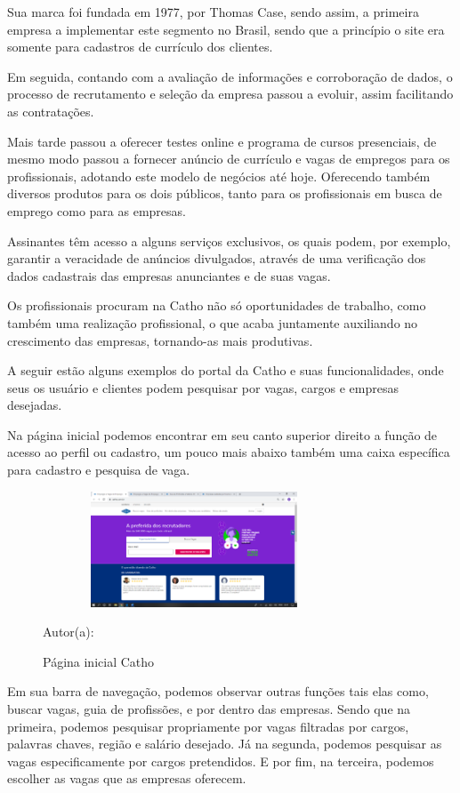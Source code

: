 Sua marca foi fundada em 1977, por Thomas Case, sendo assim, a primeira empresa a implementar este segmento no Brasil, sendo que a princípio o site era somente para cadastros de currículo dos clientes.

Em seguida, contando com a avaliação de informações e corroboração de dados, o processo de recrutamento e seleção da empresa passou a evoluir, assim facilitando as contratações.

Mais tarde passou a oferecer testes online e programa de cursos presenciais, de mesmo modo passou a fornecer anúncio de currículo e vagas de empregos para os profissionais, adotando este modelo de negócios até hoje. Oferecendo também diversos produtos para os dois públicos, tanto para os profissionais em busca de emprego como para as empresas.

Assinantes têm acesso a alguns serviços exclusivos, os quais podem, por exemplo, garantir a veracidade de anúncios divulgados, através de uma verificação dos dados cadastrais das empresas anunciantes e de suas vagas.

Os profissionais procuram na Catho não só oportunidades de trabalho, como também uma realização profissional, o que acaba juntamente auxiliando no crescimento das empresas, tornando-as mais produtivas.

A seguir estão alguns exemplos do portal da Catho e suas funcionalidades, onde seus os usuário e clientes podem pesquisar por vagas, cargos e empresas desejadas.

Na página inicial podemos encontrar em seu canto superior direito a função de acesso ao perfil ou cadastro, um pouco mais abaixo também uma caixa específica para cadastro e pesquisa de vaga.

\begin{figure}[!h]
	\centering
	\caption{Página inicial Catho }
	\includegraphics[width=340px, height=130px]{./images/cattho.png}
	\par {Autor(a): \cite{catho}}
\end{figure}
\newpage
Em sua barra de navegação, podemos observar outras funções tais elas como, buscar vagas, guia de profissões, e por dentro das empresas. Sendo que na primeira, podemos pesquisar propriamente por vagas filtradas por cargos, palavras chaves, região e salário desejado. Já na segunda, podemos pesquisar as vagas especificamente por cargos pretendidos. E por fim, na terceira, podemos escolher as vagas que as empresas oferecem.

